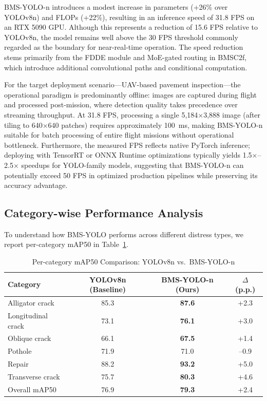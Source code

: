 BMS-YOLO-n introduces a modest increase in parameters (+26\% over YOLOv8n) and FLOPs (+22\%), resulting in an inference speed of 31.8 FPS on an RTX 5090 GPU. Although this represents a reduction of 15.6 FPS relative to YOLOv8n, the model remains well above the 30 FPS threshold commonly regarded as the boundary for near-real-time operation. The speed reduction stems primarily from the FDDE module and MoE-gated routing in BMSC2f, which introduce additional convolutional paths and conditional computation.

For the target deployment scenario---UAV-based pavement inspection---the operational paradigm is predominantly offline: images are captured during flight and processed post-mission, where detection quality takes precedence over streaming throughput. At 31.8 FPS, processing a single 5,184$\times$3,888 image (after tiling to 640$\times$640 patches) requires approximately 100~ms, making BMS-YOLO-n suitable for batch processing of entire flight missions without operational bottleneck. Furthermore, the measured FPS reflects native PyTorch inference; deploying with TensorRT or ONNX Runtime optimizations typically yields 1.5$\times$--2.5$\times$ speedups for YOLO-family models, suggesting that BMS-YOLO-n can potentially exceed 50 FPS in optimized production pipelines while preserving its accuracy advantage.

\subsection{Category-wise Performance Analysis}

To understand how BMS-YOLO performs across different distress types, we report per-category mAP50 in Table~\ref{tab:category}.

\begin{table}[!t]
\caption{Per-category mAP50 Comparison: YOLOv8n vs.\ BMS-YOLO-n}
\label{tab:category}
\centering
\setlength{\tabcolsep}{4pt}
\begin{tabular}{l|c|c|c}
\hline
\hline
Category & YOLOv8n (Baseline) & BMS-YOLO-n (Ours) & $\Delta$ (p.p.) \\
\hline
Alligator crack    & 85.3 & \textbf{87.6} & +2.3 \\
Longitudinal crack & 73.1 & \textbf{76.1} & +3.0 \\
Oblique crack      & 66.1 & \textbf{67.5} & +1.4 \\
Pothole            & 71.9 & 71.0 & --0.9 \\
Repair             & 88.2 & \textbf{93.2} & +5.0 \\
Transverse crack   & 75.7 & \textbf{80.3} & +4.6 \\
\hline
Overall mAP50 & 76.9 & \textbf{79.3} & +2.4 \\
\hline
\end{tabular}
\end{table}

